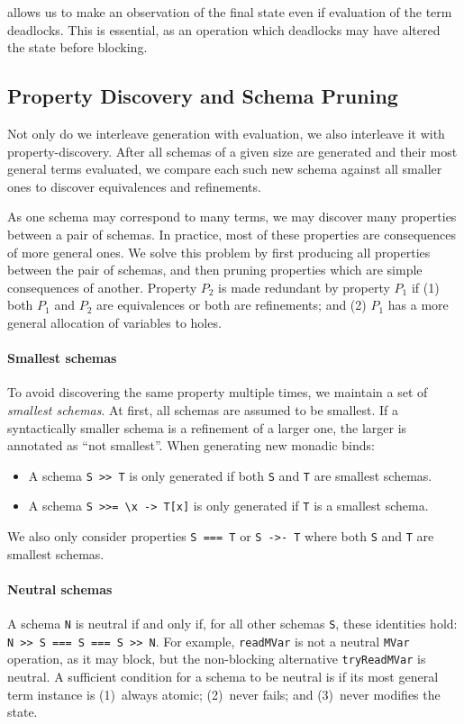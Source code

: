 \dejafu{} allows us to make an observation of the final state even if
evaluation of the term deadlocks.  This is essential, as an operation
which deadlocks may have altered the state before blocking.

\subsection{Property Discovery and Schema Pruning}
\label{sec:coco-hiw-prune}

Not only do we interleave generation with evaluation, we also
interleave it with property-discovery.  After all schemas of a given
size are generated and their most general terms evaluated, we compare
each such new schema against all smaller ones to discover equivalences
and refinements.

As one schema may correspond to many terms, we may discover many
properties between a pair of schemas.  In practice, most of these
properties are consequences of more general ones.  We solve this
problem by first producing all properties between the pair of schemas,
and then pruning properties which are simple consequences of another.
Property $P_2$ is made redundant by property $P_1$ if (1) both $P_1$
and $P_2$ are equivalences or both are refinements; and (2) $P_1$ has
a more general allocation of variables to holes.

\paragraph{Smallest schemas}
To avoid discovering the same property multiple times, we maintain a
set of \emph{smallest schemas}.  At first, all schemas are assumed to
be smallest.  If a syntactically smaller schema is a refinement of a
larger one, the larger is annotated as ``not smallest''.  When
generating new monadic binds:

\begin{itemize}
\item A schema \verb|S >> T| is only generated if both \verb|S| and
  \verb|T| are smallest schemas.
\item A schema \verb|S >>= \x -> T[x]| is only generated if \verb|T|
  is a smallest schema.
\end{itemize}

We also only consider properties \verb|S === T| or \verb|S ->- T|
where both \verb|S| and \verb|T| are smallest schemas.

\paragraph{Neutral schemas}
A schema \verb|N| is neutral if and only if, for all other schemas
\verb|S|, these identities hold: \verb|N >> S === S === S >> N|.  For
example, \verb|readMVar| is not a neutral \verb|MVar| operation, as it
may block, but the non-blocking alternative \verb|tryReadMVar| is
neutral.  A sufficient condition for a schema to be neutral is if its
most general term instance is (1)~always atomic; (2)~never fails; and
(3)~never modifies the state.

